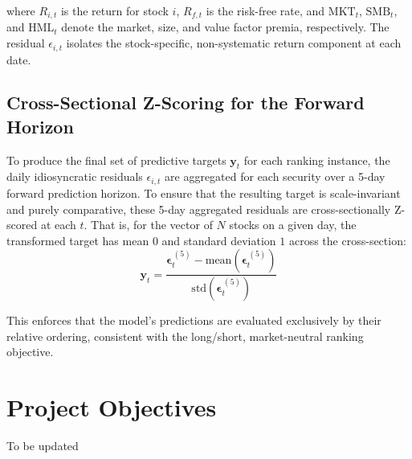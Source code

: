 where $R_{i,t}$ is the return for stock $i$, $R_{f,t}$ is the risk-free rate, and $\mathrm{MKT}_t$, $\mathrm{SMB}_t$, and $\mathrm{HML}_t$ denote the market, size, and value factor premia, respectively. The residual $\epsilon_{i,t}$ isolates the stock-specific, non-systematic return component at each date.

\subsection*{Cross-Sectional Z-Scoring for the Forward Horizon}

To produce the final set of predictive targets $\mathbf{y}_t$ for each ranking instance, the daily idiosyncratic residuals $\epsilon_{i,t}$ are aggregated for each security over a 5-day forward prediction horizon. To ensure that the resulting target is scale-invariant and purely comparative, these 5-day aggregated residuals are cross-sectionally Z-scored at each $t$. That is, for the vector of $N$ stocks on a given day, the transformed target has mean $0$ and standard deviation $1$ across the cross-section:
\begin{equation}
	\mathbf{y}_t = \frac{\boldsymbol{\epsilon}^{\,(5)}_t - \mathrm{mean}(\boldsymbol{\epsilon}^{\,(5)}_t)}{\mathrm{std}(\boldsymbol{\epsilon}^{\,(5)}_t)}
\end{equation}

This enforces that the model's predictions are evaluated exclusively by their relative ordering, consistent with the long/short, market-neutral ranking objective.

\section{Project Objectives} \label{sec:project-objectives}
To be updated